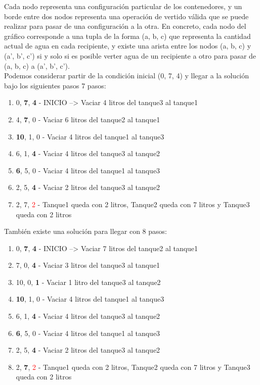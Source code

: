 \documentclass{article}
\begin{document}
Cada nodo representa una configuración particular de los contenedores, y un borde entre dos nodos representa una operación de vertido válida que se puede realizar para pasar de una configuración a la otra. En concreto, cada nodo del gráfico corresponde a una tupla de la forma (a, b, c) que representa la cantidad actual de agua en cada recipiente, y existe una arista entre los nodos (a, b, c) y (a', b', c') si y solo si es posible verter agua de un recipiente a otro para pasar de (a, b, c) a (a', b', c').\\

Podemos considerar partir de la condición inicial (0, 7, 4) y llegar a la solución bajo los siguientes pasos 7 pasos:
\begin{enumerate}
\item 0, \textbf{7}, \textbf{4} - INICIO --> Vaciar 4 litros del tanque3 al tanque1
\item 4, \textbf{7}, 0 - Vaciar 6 litros del tanque2 al tanque1
\item \textbf{10}, 1, 0 - Vaciar 4 litros del tanque1 al tanque3
\item 6, 1, \textbf{4} - Vaciar 4 litros del tanque3 al tanque2
\item \textbf{6}, 5, 0 - Vaciar 4 litros del tanque1 al tanque3
\item 2, 5, \textbf{4} - Vaciar 2 litros del tanque3 al tanque2
\item 2, 7, \textcolor{red}{2} - Tanque1 queda con 2 litros, Tanque2 queda con 7 litros y Tanque3 queda con 2 litros
\end{enumerate}

También existe una solución para llegar con 8 pasos:
\begin{enumerate}
\item 0, \textbf{7}, \textbf{4} - INICIO --> Vaciar 7 litros del tanque2 al tanque1
\item 7, 0, \textbf{4} - Vaciar 3 litros del tanque3 al tanque1
\item 10, 0, \textbf{1} - Vaciar 1 litro del tanque3 al tanque2
\item \textbf{10}, 1, 0 - Vaciar 4 litros del tanque1 al tanque3
\item 6, 1, \textbf{4} - Vaciar 4 litros del tanque3 al tanque2
\item \textbf{6}, 5, 0 - Vaciar 4 litros del tanque1 al tanque3
\item 2, 5, \textbf{4} - Vaciar 2 litros del tanque3 al tanque2
\item 2, \textbf{7}, \textcolor{red}{2} - Tanque1 queda con 2 litros, Tanque2 queda con 7 litros y Tanque3 queda con 2 litros
\end{enumerate}
\end{document}
